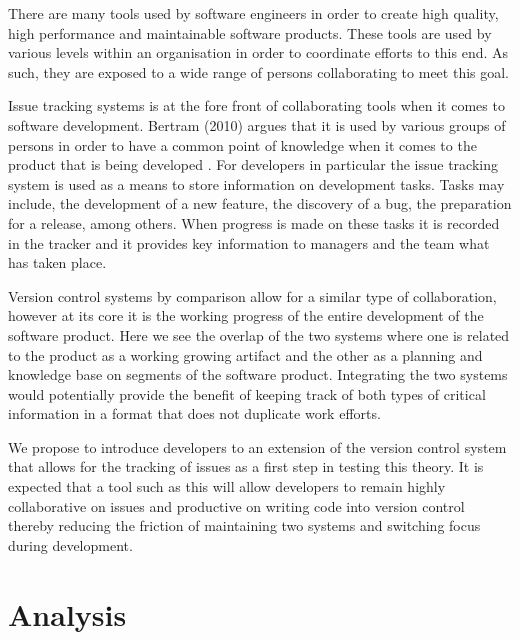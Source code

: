 \documentclass{mproj}
\begin{document}
There are many tools used by software engineers in order to create high quality, high performance and maintainable software products. These tools are used by various levels within an organisation in order to coordinate efforts to this end. As such, they are exposed to a wide range of persons collaborating to meet this goal.

Issue tracking systems is at the fore front of collaborating tools when it comes to software development. Bertram (2010) argues that it is used by various groups of persons in order to have a common point of knowledge when it comes to the product that is being developed \cite{Bertram:2010}. For developers in particular the issue tracking system is used as a means to store information on development tasks. Tasks may include, the development of a new feature, the discovery of a bug, the preparation for a release, among others. When progress is made on these tasks it is recorded in the tracker and it provides key information to managers and the team what has taken place.

Version control systems by comparison allow for a similar type of collaboration, however at its core it is the working progress of the entire development of the software product. Here we see the overlap of the two systems where one is related to the product as a working growing artifact and the other as a planning and knowledge base on segments of the software product. Integrating the two systems would potentially provide the benefit of keeping track of both types of critical information in a format that does not duplicate work efforts.

We propose to introduce developers to an extension of the version control system that allows for the tracking of issues as a first step in testing this theory. It is expected that a tool such as this will allow developers to remain highly collaborative on issues and productive on writing code into version control thereby reducing the friction of maintaining two systems and switching focus during development.

\chapter{Analysis}\label{analysis}


\end{document}
